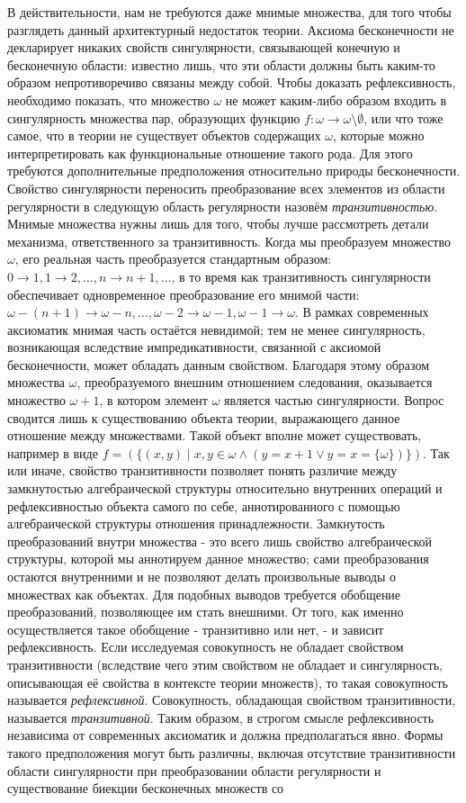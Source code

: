 \documentclass[12pt]{article}
\begin{document}
В действительности, нам не требуются даже мнимые множества, для того чтобы разглядеть данный архитектурный недостаток теории. Аксиома бесконечности не декларирует никаких свойств сингулярности, связывающей конечную и бесконечную области: известно лишь, что эти области должны быть каким-то образом непротиворечиво связаны между собой. Чтобы доказать рефлексивность, необходимо показать, что множество $\omega$ не может каким-либо образом входить в сингулярность множества пар, образующих функцию $f : \omega \to \omega \setminus \emptyset$, или что тоже самое, что в теории не существует объектов содержащих $\omega$, которые можно интерпретировать как функциональные отношение такого рода. Для этого требуются дополнительные предположения относительно природы бесконечности. Свойство сингулярности переносить преобразование всех элементов из области регулярности в следующую область регулярности назовём {\it транзитивностью}. Мнимые множества нужны лишь для того, чтобы лучше рассмотреть детали механизма, ответственного за транзитивность. Когда мы преобразуем множество $\omega$, его реальная часть преобразуется стандартным образом: $0 \to 1, 1 \to 2, \dots, n \to n + 1, \dots$, в то время как транзитивность сингулярности обеспечивает одновременное преобразование его мнимой части: $\omega - (n + 1) \to \omega - n, \dots, \omega - 2 \to \omega - 1, \omega - 1 \to \omega$. В рамках современных аксиоматик мнимая часть остаётся невидимой; тем не менее сингулярность, возникающая вследствие импредикативности, связанной с аксиомой бесконечности, может обладать данным свойством. Благодаря этому образом множества $\omega$, преобразуемого внешним отношением следования, оказывается множество $\omega + 1$, в котором элемент $\omega$ является частью сингулярности. Вопрос сводится лишь к существованию объекта теории, выражающего данное отношение между множествами. Такой объект вполне может существовать, например в виде $f = (\{ (x, y) \mid x, y \in \omega \wedge (y = x + 1 \vee y = x = \{ \omega \}) \})$. Так или иначе, свойство транзитивности позволяет понять различие между замкнутостью алгебраической структуры относительно внутренних операций и рефлексивностью объекта самого по себе, аннотированного с помощью алгебраической структуры отношения принадлежности. Замкнутость преобразований внутри множества - это всего лишь свойство алгебраической структуры, которой мы аннотируем данное множество; сами преобразования остаются внутренними и не позволяют делать произвольные выводы о множествах как объектах. Для подобных выводов требуется обобщение преобразований, позволяющее им стать внешними. От того, как именно осуществляется такое обобщение - транзитивно или нет, - и зависит рефлексивность. Если исследуемая совокупность не обладает свойством транзитивности (вследствие чего этим свойством не обладает и сингулярность, описывающая её свойства в контексте теории множеств), то такая совокупность называется {\it рефлексивной}. Совокупность, обладающая свойством транзитивности, называется  {\it транзитивной}. Таким образом, в строгом смысле рефлексивность независима от современных аксиоматик и должна предполагаться явно. Формы такого предположения могут быть различны, включая отсутствие транзитивности области сингулярности при преобразовании области регулярности и существование биекции бесконечных множеств со 
\end{document}
